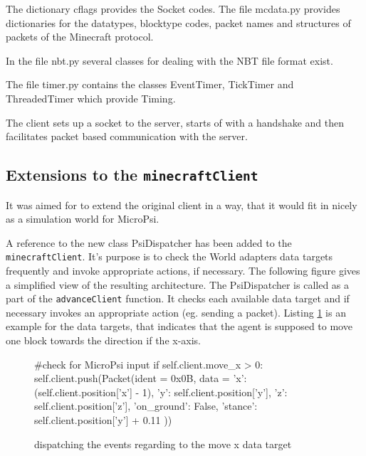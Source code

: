 The dictionary cflags provides the Socket codes.
The file mcdata.py provides dictionaries for the datatypes, blocktype codes, packet names and structures of packets of the Minecraft protocol.

In the file nbt.py several classes for dealing with the NBT file format exist.

The file timer.py contains the classes EventTimer, TickTimer and ThreadedTimer which provide Timing.

The client sets up a socket to the server, starts of with a handshake and then facilitates packet based communication with the server.

        \subsection{Extensions to the \texttt{minecraftClient}}
It was aimed for to extend the original client in a way, that it would fit in nicely as a simulation world for MicroPsi.
        
A reference to the new class PsiDispatcher has been added to the \texttt{minecraftClient}. It's purpose is to check the World adapters data targets frequently and invoke appropriate actions, if necessary. The following figure gives a simplified view of the resulting architecture. The PsiDispatcher is called as a part of the \texttt{advanceClient} function. It checks each available data target and if necessary invokes an appropriate action (eg. sending a packet). Listing \ref{listing_dispatch} is an example for the data targets, that indicates that the agent is supposed to move one block towards the direction if the x-axis.

		\begin{figure}[ht]
			\centering
			\begin{minipage}{11cm}
				\begin{pseudocode}
#check for MicroPsi input
if self.client.move_x > 0:
    self.client.push(Packet(ident = 0x0B, data = {
        'x': (self.client.position['x'] - 1),
        'y': self.client.position['y'],
        'z': self.client.position['z'],
        'on_ground': False,
        'stance': self.client.position['y'] + 0.11
        }))
					\end{pseudocode}
				\caption{dispatching the events regarding to the move x data target}
				\label{listing_dispatch}
			\end{minipage}
		\end{figure}


